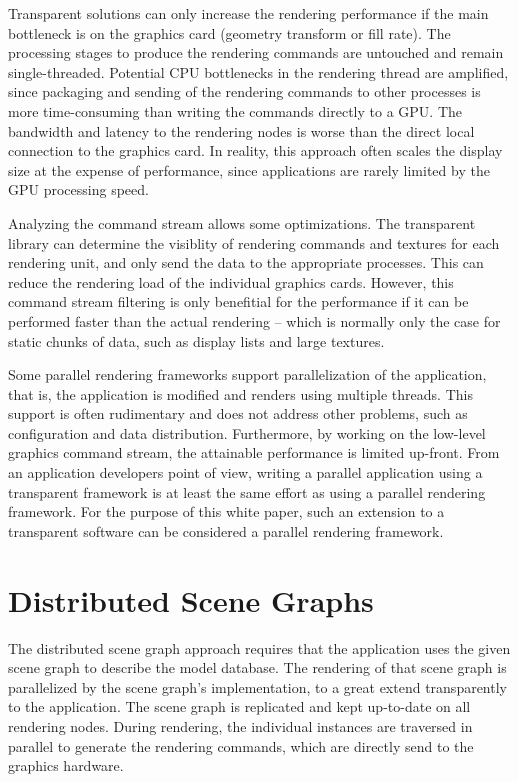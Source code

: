 \documentclass[10pt,a4paper]{scrartcl}
\begin{document}
Transparent solutions can only increase the rendering performance if the
main bottleneck is on the graphics card (geometry transform or fill rate). The
processing stages to produce the rendering commands are untouched and
remain single-threaded. Potential CPU bottlenecks in the rendering
thread are amplified, since packaging and sending of the rendering
commands to other processes is more time-consuming than writing the
commands directly to a GPU. The bandwidth and latency to the rendering
nodes is worse than the direct local connection to the graphics card. In
reality, this approach often scales the display size at the expense of
performance, since applications are rarely limited by the GPU
processing speed.

Analyzing the command stream allows some optimizations. The transparent
library can determine the visiblity of rendering commands and textures for each
rendering unit, and only send the data to the appropriate processes.
This can reduce the rendering load of the individual graphics
cards. However, this command stream filtering is only benefitial for the
performance if it can be performed faster than the actual rendering --
which is normally only the case for static chunks of data, such as display
lists and large textures. %

Some parallel rendering frameworks support parallelization of the
application, that is, the application is modified and renders using
multiple threads. This support is often rudimentary and does not address other
problems, such as configuration and data distribution. Furthermore, by
working on the low-level graphics command stream, the attainable
performance is limited up-front. From an application developers point of
view, writing a parallel application using a transparent framework is at
least the same effort as using a parallel rendering framework. For the
purpose of this white paper, such an extension to a transparent software
can be considered a parallel rendering framework.

\section{Distributed Scene Graphs}
The distributed scene graph approach requires that the application uses
the given scene graph to describe the model database. The rendering of
that scene graph is parallelized by the scene graph's implementation, to
a great extend transparently to the application. The scene graph is
replicated and kept up-to-date on all rendering nodes. During rendering,
the individual instances are traversed in parallel to generate the
rendering commands, which are directly send to the graphics hardware.
\end{document}

